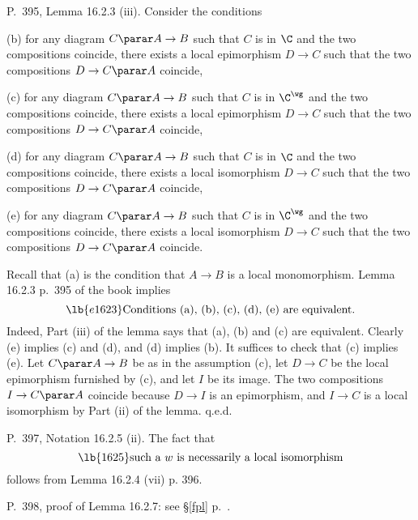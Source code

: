 \documentclass[12pt]{article}
\theoremstyle{remark}
\theoremstyle{definition}
\begin{document}
%

\begin{s}
P.~395, Lemma 16.2.3 (iii). Consider the conditions

\nn(b) for any diagram $C\parar A\to B$ such that $C$ is in $\C$ and the two compositions coincide, there exists a local epimorphism $D\to C$ such that the two compositions $D\to C\parar A$ coincide,

\nn(c) for any diagram $C\parar A\to B$ such that $C$ is in $\C^\wg$ and the two compositions coincide, there exists a local epimorphism $D\to C$ such that the two compositions $D\to C\parar A$ coincide,

\nn(d) for any diagram $C\parar A\to B$ such that $C$ is in $\C$ and the two compositions coincide, there exists a local isomorphism $D\to C$ such that the two compositions $D\to C\parar A$ coincide,

\nn(e) for any diagram $C\parar A\to B$ such that $C$ is in $\C^\wg$ and the two compositions coincide, there exists a local isomorphism $D\to C$ such that the two compositions $D\to C\parar A$ coincide.

Recall that (a) is the condition that $A\to B$ is a local monomorphism. Lemma 16.2.3 p.~395 of the book implies 
%
\begin{equation}\lb{e1623}
\text{Conditions (a), (b), (c), (d), (e) are equivalent.}
\end{equation}
%
Indeed, Part (iii) of the lemma says that (a), (b) and (c) are equivalent. Clearly (e) implies (c) and (d), and (d) implies (b). It suffices to check that (c) implies (e). Let $C\parar A\to B$ be as in the assumption (c), let $D\to C$ be the local epimorphism furnished by (c), and let $I$ be its image. The two compositions $I\to C\parar A$ coincide because $D\to I$ is an epimorphism, and $I\to C$ is a local isomorphism by Part (ii) of the lemma. q.e.d.
\end{s}

%

\begin{s} 
P.~397, Notation 16.2.5 (ii). The fact that 
\begin{equation}\lb{1625}
\text{such a $w$ is necessarily a local isomorphism}
\end{equation}
follows from Lemma 16.2.4 (vii) p. 396.
\end{s}

%

\begin{s} 
P.~398, proof of Lemma 16.2.7: see \S\ref{fpl} p.~.
\end{s}
\end{document}
